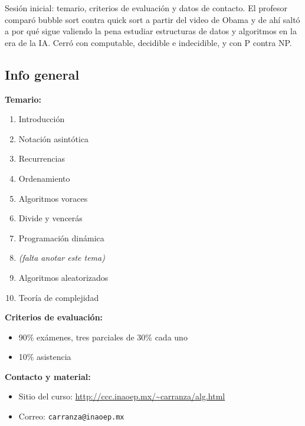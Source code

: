\documentclass[11pt,letterpaper]{article}
\begin{document}

\portadilla
\newpage



\begin{quick_sum}
  Sesión inicial: temario, criterios de evaluación y datos de
  contacto. El profesor comparó bubble sort contra quick sort a partir
  del video de Obama y de ahí saltó a por qué sigue valiendo la pena
  estudiar estructuras de datos y algoritmos en la era de la IA. Cerró
  con computable, decidible e indecidible, y con P contra NP.
\end{quick_sum}


\subsection*{Info general}

\textbf{Temario:}
\begin{enumerate}[itemsep=0.1em]
    \item Introducción
    \item Notación asintótica
    \item Recurrencias
    \item Ordenamiento
    \item Algoritmos voraces
    \item Divide y vencerás
    \item Programación dinámica
    \item \textit{(falta anotar este tema)}
    \item Algoritmos aleatorizados
    \item Teoría de complejidad
\end{enumerate}

\textbf{Criterios de evaluación:}
\begin{itemize}[itemsep=0.1em]
    \item 90\% exámenes, tres parciales de 30\% cada uno
    \item 10\% asistencia
\end{itemize}

\textbf{Contacto y material:}
\begin{itemize}[itemsep=0.1em]
    \item Sitio del curso:
          \url{http://ccc.inaoep.mx/~carranza/alg.html}
    \item Correo: \texttt{carranza@inaoep.mx}
\end{itemize}
\end{document}
